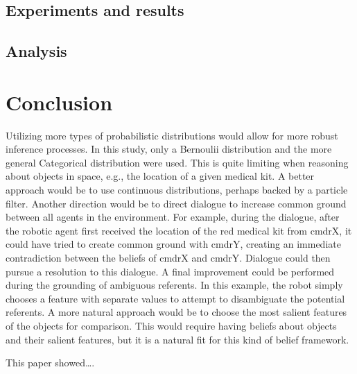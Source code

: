 \documentclass[12pt]{article}
\begin{document}
\subsection{Experiments and results}
\label{sec:experiments}


\subsection{Analysis}
\label{sec:analysis}

\section{Conclusion}
\label{sec:conclusion}


Utilizing more types of probabilistic distributions would allow for
more robust inference processes. In this study, only a Bernoulii
distribution and the more general Categorical distribution were
used. This is quite limiting when reasoning about objects in space,
e.g., the location of a given medical kit. A better approach would be
to use continuous distributions, perhaps backed by a particle filter.
Another direction would be to direct dialogue to increase common
ground between all agents in the environment. For example, during the
dialogue, after the robotic agent first received the location of the
red medical kit from cmdrX, it could have tried to create common
ground with cmdrY, creating an immediate contradiction between the
beliefs of cmdrX and cmdrY. Dialogue could then pursue a resolution to
this dialogue. A final improvement could be performed during the
grounding of ambiguous referents. In this example, the robot simply
chooses a feature with separate values to attempt to disambiguate the
potential referents. A more natural approach would be to choose the
most salient features of the objects for comparison. This would
require having beliefs about objects and their salient features, but
it is a natural fit for this kind of belief framework.

This paper showed\dots.
 {\small }
\end{document}
